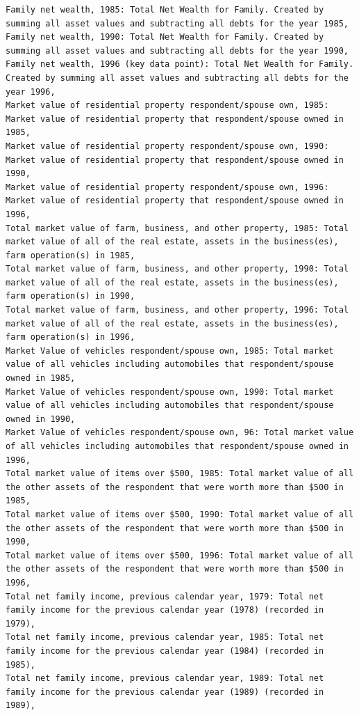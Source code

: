 \begin{verbatim}
Family net wealth, 1985: Total Net Wealth for Family. Created by summing all asset values and subtracting all debts for the year 1985,
Family net wealth, 1990: Total Net Wealth for Family. Created by summing all asset values and subtracting all debts for the year 1990,
Family net wealth, 1996 (key data point): Total Net Wealth for Family. Created by summing all asset values and subtracting all debts for the year 1996,
Market value of residential property respondent/spouse own, 1985: Market value of residential property that respondent/spouse owned in 1985,
Market value of residential property respondent/spouse own, 1990: Market value of residential property that respondent/spouse owned in 1990,
Market value of residential property respondent/spouse own, 1996: Market value of residential property that respondent/spouse owned in 1996,
Total market value of farm, business, and other property, 1985: Total market value of all of the real estate, assets in the business(es), farm operation(s) in 1985,
Total market value of farm, business, and other property, 1990: Total market value of all of the real estate, assets in the business(es), farm operation(s) in 1990,
Total market value of farm, business, and other property, 1996: Total market value of all of the real estate, assets in the business(es), farm operation(s) in 1996,
Market Value of vehicles respondent/spouse own, 1985: Total market value of all vehicles including automobiles that respondent/spouse owned in 1985,
Market Value of vehicles respondent/spouse own, 1990: Total market value of all vehicles including automobiles that respondent/spouse owned in 1990,
Market Value of vehicles respondent/spouse own, 96: Total market value of all vehicles including automobiles that respondent/spouse owned in 1996,
Total market value of items over $500, 1985: Total market value of all the other assets of the respondent that were worth more than $500 in 1985,
Total market value of items over $500, 1990: Total market value of all the other assets of the respondent that were worth more than $500 in 1990,
Total market value of items over $500, 1996: Total market value of all the other assets of the respondent that were worth more than $500 in 1996,
Total net family income, previous calendar year, 1979: Total net family income for the previous calendar year (1978) (recorded in 1979),
Total net family income, previous calendar year, 1985: Total net family income for the previous calendar year (1984) (recorded in 1985),
Total net family income, previous calendar year, 1989: Total net family income for the previous calendar year (1989) (recorded in 1989),

\end{verbatim}
